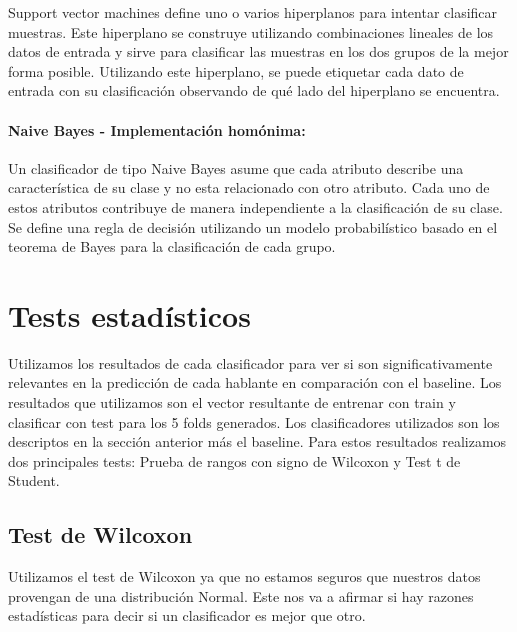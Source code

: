 
Support vector machines define uno o varios hiperplanos para intentar clasificar muestras. Este hiperplano se construye utilizando combinaciones lineales de los datos de entrada y sirve para clasificar las muestras en los dos grupos de la mejor forma posible. Utilizando este hiperplano, se puede etiquetar cada dato de entrada con su clasificación observando de qué lado del hiperplano se encuentra.

\paragraph{Naive Bayes \cite{DBLP:conf/flairs/Zhang04} - Implementación homónima:}


Un clasificador de tipo Naive Bayes asume que cada atributo describe una característica de su clase y no esta relacionado con otro atributo. Cada uno de estos atributos contribuye de manera independiente a la clasificación de su clase. Se define una regla de decisión utilizando un modelo probabilístico basado en el teorema de Bayes para la clasificación de cada grupo.

\section{Tests estadísticos}

Utilizamos los resultados de cada clasificador para ver si son significativamente relevantes en la predicción de cada hablante en comparación con el baseline. Los resultados que utilizamos son el vector resultante de entrenar con train y clasificar con test para los 5 folds  generados. Los clasificadores utilizados son los descriptos en la sección anterior más el baseline. Para estos resultados realizamos dos principales tests: Prueba de rangos con signo de Wilcoxon y Test t de Student. 

\subsection{Test de Wilcoxon}

Utilizamos el test de Wilcoxon ya que no estamos seguros que nuestros datos provengan de una distribución Normal. Este nos va a afirmar si hay razones estadísticas para decir si un clasificador es mejor que otro.

